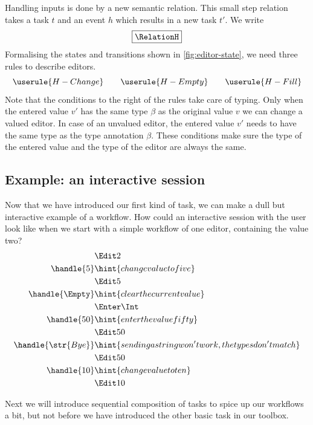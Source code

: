 Handling inputs is done by a new semantic relation.
This small step relation takes a task $t$ and an event $h$ which results in a new task $t'$.
We write
\begin{equation*}
  \boxed{\RelationH}
\end{equation*}
Formalising the states and transitions shown in \autoref{fig:editor-state},
we need three rules to describe editors.
\begin{equation*}
  \userule{H-Change} \qquad \userule{H-Empty} \qquad \userule{H-Fill}
\end{equation*}
Note that the conditions to the right of the rules take care of typing.
Only when the entered value $v'$ has the same type $\beta$ as the original value $v$ we can change a valued editor.
In case of an unvalued editor,
the entered value $v'$ needs to have the same type as the type annotation $\beta$.
These conditions make sure the type of the entered value and the type of the editor are always the same.


\subsection{Example: an interactive session}

Now that we have introduced our first kind of task,
we can make a dull but interactive example of a workflow.
How could an interactive session with the user look like when we start with a simple workflow of one editor,
containing the value two?
\begin{align*}
    & \Edit 2 \\
  \handle{5} & \hint{change value to five} \\
    & \Edit 5 \\
  \handle{\Empty} & \hint{clear the current value} \\
    & \Enter \Int \\
  \handle{50} & \hint{enter the value fifty} \\
    & \Edit 50 \\
  \handle{\str{Bye}} & \hint{sending a string won't work, the types don't match} \\
    & \Edit 50 \\
  \handle{10} & \hint{change value to ten} \\
    & \Edit 10
\end{align*}

Next we will introduce sequential composition of tasks to spice up our workflows a bit,
but not before we have introduced the other basic task in our toolbox.
